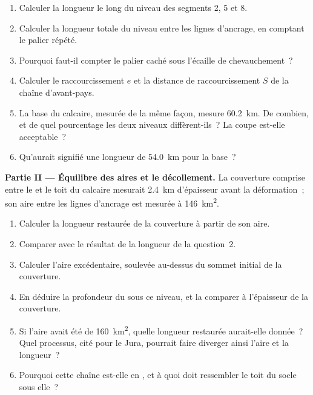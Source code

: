 \begin{problem}
\begin{enumerate}
\item Calculer la longueur le long du niveau des segments 2, 5 et 8.
\item Calculer la longueur totale du niveau entre les lignes d'ancrage, en comptant le
palier répété.
\item Pourquoi faut-il compter le palier caché sous l'écaille de chevauchement~?
\item Calculer le raccourcissement $e$ et la distance de raccourcissement $S$ de la chaîne d'avant-pays.
\item La base du calcaire, mesurée de la même façon, mesure \qty{60.2}{km}. De combien,
et de quel pourcentage les deux niveaux diffèrent-ils~? La coupe est-elle acceptable~?
\item Qu'aurait signifié une longueur de \qty{54.0}{km} pour la base~?
\end{enumerate}

\noindent\textbf{Partie II --- Équilibre des aires et le décollement.} La couverture comprise entre le
 et le toit du calcaire mesurait \qty{2.4}{km} d'épaisseur avant la déformation~; son aire
entre les lignes d'ancrage est mesurée à \qty{146}{km^2}.
\begin{enumerate}[resume]
\item Calculer la longueur restaurée de la couverture à partir de son aire.
\item Comparer avec le résultat de la longueur de la question~2.
\item Calculer l'aire excédentaire, soulevée au-dessus du sommet initial de la couverture.
\item En déduire la profondeur du  sous ce niveau, et la comparer à l'épaisseur de la
couverture.
\item Si l'aire avait été de \qty{160}{km^2}, quelle longueur restaurée aurait-elle donnée~? Quel processus,
cité pour le Jura, pourrait faire diverger ainsi l'aire et la longueur~?
\item Pourquoi cette chaîne est-elle en , et à quoi doit ressembler le toit du socle
sous elle~?
\end{enumerate}


\end{problem}
